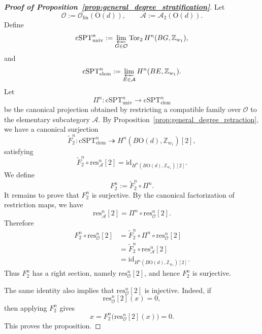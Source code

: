 \documentclass[aps,prx,reprint,superscriptaddress,twocolumn,amsmath,amssymb,amsfonts, nofootinbib]{revtex4-2}
\newcommand{\res}{\text{res}}
\theoremstyle{apsstyle}
\begin{document}
\begin{proof}[\textnormal{\textbf{Proof of Proposition~\ref{prop:general_degree_stratification}}}]
Let
\begin{equation}
\mathcal O:=\mathcal O_{\mathrm{fin}}(\mathrm{O}(d)),
\qquad
\mathcal A:=\mathcal A_2(\mathrm{O}(d)).
\end{equation}
Define
\begin{equation}
\mathrm{cSPT}_{\mathrm{univ}}^n
:=
\varprojlim_{G\in\mathcal O}
\operatorname{Tor}_2 H^n(BG,\mathbb Z_{w_1}),
\end{equation}
and
\begin{equation}
\mathrm{cSPT}_{\mathrm{elem}}^n
:=
\varprojlim_{E\in\mathcal A}
H^n(BE,\mathbb Z_{w_1}).
\end{equation}
Let
\begin{equation}
\Pi^n:
\mathrm{cSPT}_{\mathrm{univ}}^n
\longrightarrow
\mathrm{cSPT}_{\mathrm{elem}}^n
\end{equation}
be the canonical projection obtained by restricting a compatible family over
$\mathcal O$ to the elementary subcategory $\mathcal A$. By Proposition~\ref{prop:general_degree_retraction}, we have a canonical surjection
\begin{equation}
\widetilde F_2^n:
\mathrm{cSPT}_{\mathrm{elem}}^n
\twoheadrightarrow
H^n(B\mathrm{O}(d),\mathbb Z_{w_1})[2],
\end{equation}
satisfying
\begin{equation}
\widetilde F_2^n\circ \res_{\mathcal A}^{n}[2]
=
\mathrm{id}_{H^n(B\mathrm{O}(d),\mathbb Z_{w_1})[2]}.
\end{equation}
We define
\begin{equation}
F_2^n
:=
\widetilde F_2^n\circ \Pi^n.
\end{equation}
It remains to prove that $F_2^n$ is surjective. By the canonical factorization of restriction maps, we have
\begin{equation}
\res_{\mathcal A}^{n}[2]
=
\Pi^n\circ \res_{\mathcal O}^{n}[2].
\end{equation}
Therefore
\begin{align}
F_2^n\circ \res_{\mathcal O}^{n}[2]
&=
\widetilde F_2^n\circ \Pi^n\circ \res_{\mathcal O}^{n}[2] \\
&=
\widetilde F_2^n\circ \res_{\mathcal A}^{n}[2] \\
&=
\mathrm{id}_{H^n(B\mathrm{O}(d),\mathbb Z_{w_1})[2]}.
\end{align}
Thus $F_2^n$ has a right section, namely $\res_{\mathcal O}^{n}[2]$, and hence $F_2^n$ is surjective.

\bigskip

\noindent The same identity also implies that $\res_{\mathcal O}^{n}[2]$ is injective. Indeed, if
\begin{equation}
\res_{\mathcal O}^{n}[2](x)=0,
\end{equation}
then applying $F_2^n$ gives
\begin{equation}
x
=
F_2^n\bigl(\res_{\mathcal O}^{n}[2](x)\bigr)
=
0.
\end{equation}
This proves the proposition.
\end{proof}
\end{document}
